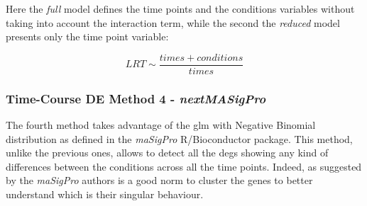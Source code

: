 Here the \textit{full} model defines the time points and the conditions variables without taking into account the interaction term, while the second the \textit{reduced} model presents only the time point variable:

\[LRT \sim \frac{times+conditions}{times}\]


\subsubsection{Time-Course DE Method 4 - \textit{nextMASigPro}}

The fourth method takes advantage of the \gls{glm} with Negative Binomial distribution as defined in the \textit{maSigPro} R/Bioconductor package.
This method, unlike the previous ones, allows to detect all the \glspl{deg} showing any kind of differences between the conditions across all the time points.
Indeed, as suggested by the \textit{maSigPro} authors is a good norm to cluster the genes to better understand which is their singular behaviour.
